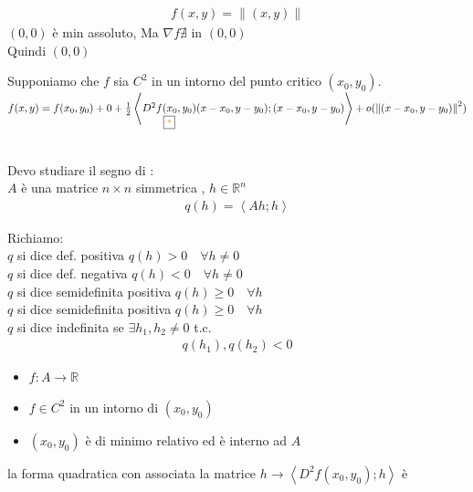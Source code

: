 \documentclass[a4paper, oneside]{article}
\begin{document}
        \begin{example}
                \begin{gather*}
                    f(x,y) = \left\lVert (x,y) \right\rVert 
                \end{gather*}
                $(0,0)$ è min assoluto, Ma $\nabla f \nexists$ in $(0,0)$\\
                Quindi $(0,0)$ 
        \end{example}


        \begin{theorem}[di Taylor]
            Supponiamo che $f$ sia $C^2$ in un intorno del punto critico $(x_0,y_0)$.\\
            $f(x,y) = f(x_0,y_0) + 0 + \frac{1}{2} \left\langle \underset{\text{\fbox{\textcolor{orange}{*}}}}{D^2f(x_0,y_0)}(x-x_0,y-y_0);(x-x_0,y-y_0)\right\rangle + o(\left\lVert (x-x_0,y-y_0)\right\rVert^2 )$
        \end{theorem}


        \hfil\\
        Devo studiare il segno di \fbox{\textcolor{orange}{*}}:\\
         $A$ è una matrice $n\times n$ simmetrica , $h \in \mathbb{R}^n$
        \begin{gather*}
            q(h) = \left\langle Ah;h \right\rangle 
        \end{gather*}


        \begin{proposition}
            Richiamo:\\
            $q$ si dice def. positiva  $q(h) > 0 \quad \forall h \neq 0$\\
            $q$ si dice def. negativa  $q(h) < 0 \quad \forall h \neq 0$\\
            $q$ si dice semidefinita positiva  $q(h) \geq 0 \quad \forall h$\\
            $q$ si dice semidefinita positiva  $q(h) \geq 0 \quad \forall h$\\
            $q$ si dice indefinita se $\exists h_1,h_2 \neq 0$ t.c.
            \begin{gather*}
                q(h_1),q(h_2) < 0
            \end{gather*}
        \end{proposition}


        \begin{theorem}            
             \begin{itemize}
                \item $f: A \to \mathbb{R}$
                \item $f \in C^2$ in un intorno di $(x_0,y_0)$
                \item $(x_0,y_0)$ è di minimo relativo ed è interno ad $A$
            \end{itemize}
             la forma quadratica con associata la matrice $h \to \left\langle D^2f(x_0,y_0);h\right\rangle$ è   
        \end{theorem}
\end{document}
